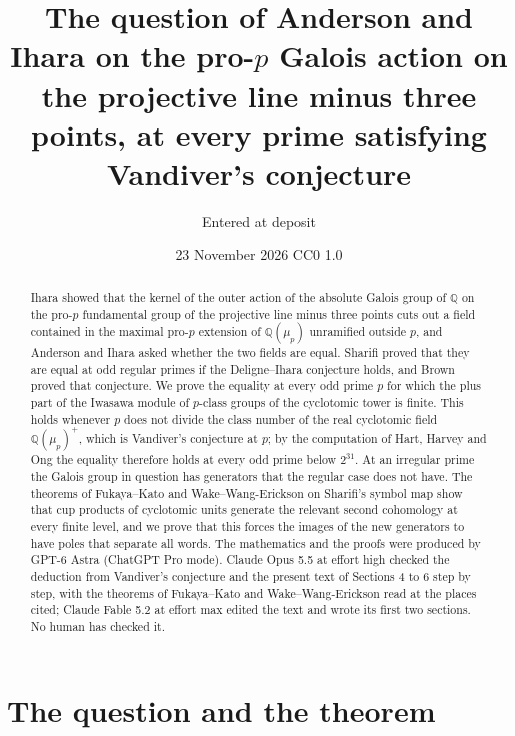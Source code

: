 \documentclass[11pt]{article}
\title{The question of Anderson and Ihara on the pro-$p$ Galois action on the projective line minus three
points, at every prime satisfying Vandiver's conjecture}
\author{Entered at deposit}
\date{23 November 2026 \quad CC0 1.0}
\theoremstyle{definition}
\numberwithin{equation}{section}
\begin{document}
\maketitle
\begin{abstract}
\noindent
Ihara showed that the kernel of the outer action of the absolute Galois group of $\mathbb Q$ on the pro-$p$
fundamental group of the projective line minus three points cuts out a field contained in the maximal pro-$p$
extension of $\mathbb Q(\mu_p)$ unramified outside $p$, and Anderson and Ihara asked whether the two fields are
equal. Sharifi proved that they are equal at odd regular primes if the Deligne--Ihara conjecture holds, and Brown
proved that conjecture. We prove the equality at every odd prime $p$ for which the plus part of the Iwasawa module
of $p$-class groups of the cyclotomic tower is finite. This holds whenever $p$ does not divide the class number of
the real cyclotomic field $\mathbb Q(\mu_p)^+$, which is Vandiver's conjecture at $p$; by the computation of Hart,
Harvey and Ong the equality therefore holds at every odd prime below $2^{31}$. At an irregular prime the Galois
group in question has generators that the regular case does not have. The theorems of Fukaya--Kato and
Wake--Wang-Erickson on Sharifi's symbol map show that cup products of cyclotomic units generate the relevant
second cohomology at every finite level, and we prove that this forces the images of the new generators to have
poles that separate all words. The mathematics and the proofs were produced by GPT-6 Astra (ChatGPT Pro mode).
Claude Opus 5.5 at effort high checked the deduction from Vandiver's conjecture and the present text of Sections 4
to 6 step by step, with the theorems of Fukaya--Kato and Wake--Wang-Erickson read at the places cited; Claude Fable
5.2 at effort max edited the text and wrote its first two sections. No human has checked it.
\end{abstract}

\section{The question and the theorem}
\end{document}
